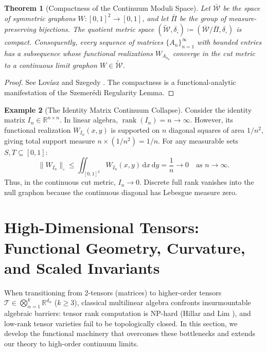 \documentclass[11pt,a4paper,reqno]{amsart}
\newtheorem{theorem}{Theorem}[section]
\theoremstyle{definition}
\newtheorem{example}[theorem]{Example}
\numberwithin{equation}{section}
\newcommand{\R}{\mathbb{R}}
\newcommand{\rank}{\operatorname{rank}}
\newcommand{\cutnorm}[1]{\|#1\|_{\square}}
\newcommand{\dif}{\,\mathrm{d}}
\begin{document}
\begin{theorem}[Compactness of the Continuum Moduli Space]
\label{thm:graphon_compactness}
Let $\bar{\mathcal{W}}$ be the space of symmetric graphons $W \colon [0, 1]^2 \to [0, 1]$, and let $\bar{\Pi}$ be the group of measure-preserving bijections. The quotient metric space $(\widetilde{\mathcal{W}}, \delta_\square) \coloneqq (\bar{\mathcal{W}} / \bar{\Pi}, \delta_\square)$ is \emph{compact}. Consequently, every sequence of matrices $\{A_n\}_{n=1}^\infty$ with bounded entries has a subsequence whose functional realizations $W_{A_{n_k}}$ converge in the cut metric to a continuous limit graphon $W \in \widetilde{\mathcal{W}}$.
\end{theorem}
\begin{proof}
See Lov\'asz and Szegedy \cite{lovasz2006limits}. The compactness is a functional-analytic manifestation of the Szemer\'edi Regularity Lemma.
\end{proof}

\begin{example}[The Identity Matrix Continuum Collapse]
Consider the identity matrix $I_n \in \R^{n \times n}$. In linear algebra, $\rank(I_n) = n \to \infty$. However, its functional realization $W_{I_n}(x, y)$ is supported on $n$ diagonal squares of area $1/n^2$, giving total support measure $n \times (1/n^2) = 1/n$. For any measurable sets $S, T \subseteq [0, 1]$:
\begin{equation}
    \cutnorm{W_{I_n}} \le \iint_{[0,1]^2} W_{I_n}(x, y) \dif x \dif y = \frac{1}{n} \longrightarrow 0 \quad \text{as } n \to \infty.
\end{equation}
Thus, in the continuous cut metric, $I_n \to 0$. Discrete full rank vanishes into the null graphon because the continuous diagonal has Lebesgue measure zero.
\end{example}

\section{High-Dimensional Tensors: Functional Geometry, Curvature, and Scaled Invariants}
\label{sec:tensors}

When transitioning from 2-tensors (matrices) to higher-order tensors $\mathcal{T} \in \bigotimes_{\alpha=1}^k \R^{d_\alpha}$ ($k \ge 3$), classical multilinear algebra confronts insurmountable algebraic barriers: tensor rank computation is NP-hard (Hillar and Lim \cite{lim2005singular}), and low-rank tensor varieties fail to be topologically closed. In this section, we develop the functional machinery that overcomes these bottlenecks and extends our theory to high-order continuum limits.
\end{document}
